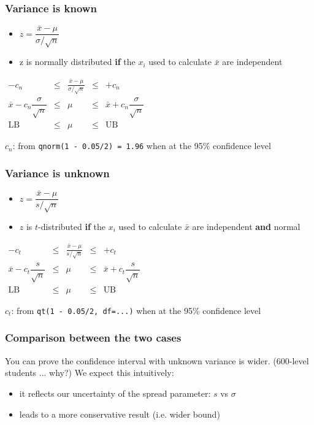 \begin{frame}\frametitle{Variance is known}
	\begin{itemize}
		\item	$z = \dfrac{\bar{x} - \mu}{\sigma/\sqrt{n}}$
		\item	z is normally distributed \textbf{if} the $x_i$ used to calculate $\bar{x}$ are independent 
	\end{itemize}

	$
	\begin{array}{rcccl}
		- c_n &\leq& \displaystyle \frac{\bar{x} - \mu}{\sigma/\sqrt{n}} &\leq & +c_n\\
		\bar{x} - c_n \dfrac{\sigma}{\sqrt{n}} &\leq& \mu &\leq& \bar{x} + c_n\dfrac{\sigma}{\sqrt{n}} \\
		\text{LB} &\leq& \mu &\leq& \text{UB}
	\end{array}
	$

	$c_n$: from \texttt{qnorm(1 - 0.05/2) = 1.96} when at the 95\% confidence level
\end{frame}

\begin{frame}\frametitle{Variance is unknown}
	\begin{itemize}
		\item	$z = \dfrac{\bar{x} - \mu}{s/\sqrt{n}}$
		\item	$z$ is $t$-distributed \textbf{if} the $x_i$ used to calculate $\bar{x}$ are independent \textbf{and} normal
	\end{itemize}

	$
	\begin{array}{rcccl}
		- c_t &\leq& \displaystyle \frac{\bar{x} - \mu}{s/\sqrt{n}} &\leq & +c_t\\
		\bar{x} - c_t \dfrac{s}{\sqrt{n}} &\leq& \mu &\leq& \bar{x} + c_t\dfrac{s}{\sqrt{n}} \\
		\text{LB} &\leq& \mu &\leq& \text{UB}
	\end{array}
	$

	$c_t$: from \texttt{qt(1 - 0.05/2, df=...)} when at the 95\% confidence level
\end{frame}

\begin{frame}\frametitle{Comparison between the two cases}

	You can prove the confidence interval with unknown variance is wider. (600-level students ... why?)
	\vspace{12pt}
	We expect this intuitively:
	\begin{itemize}
		\item	it reflects our uncertainty of the spread parameter: $s$ vs $\sigma$
		\item	leads to a more conservative result (i.e. wider bound)
	\end{itemize}
\end{frame}

